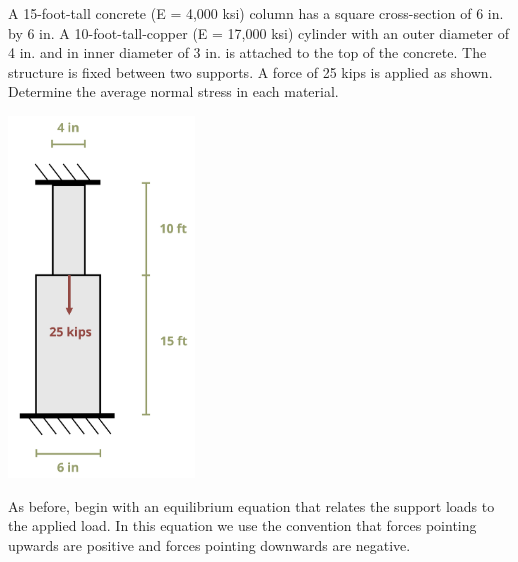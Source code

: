 \documentclass[
  letterpaper,
  DIV=11,
  numbers=noendperiod]{scrreprt}
\begin{document}
\begin{tcolorbox}[enhanced jigsaw, breakable, opacityback=0, toptitle=1mm, left=2mm, colback=white, opacitybacktitle=0.6, colframe=quarto-callout-tip-color-frame, titlerule=0mm, arc=.35mm, leftrule=.75mm, bottomtitle=1mm, colbacktitle=quarto-callout-tip-color!10!white, rightrule=.15mm, title={Example 5.6}, bottomrule=.15mm, toprule=.15mm, coltitle=black]

A 15-foot-tall concrete (E = 4,000 ksi) column has a square
cross-section of 6 in. by 6 in. A 10-foot-tall-copper (E = 17,000 ksi)
cylinder with an outer diameter of 4 in. and in inner diameter of 3 in.
is attached to the top of the concrete. The structure is fixed between
two supports. A force of 25 kips is applied as shown. Determine the
average normal stress in each material.

\begin{center}
\includegraphics[width=1.94792in,height=\textheight]{images/PNGs/Example 5.6 part 1.png}
\end{center}

\begin{tcolorbox}[enhanced jigsaw, breakable, opacityback=0, toptitle=1mm, left=2mm, colback=white, opacitybacktitle=0.6, colframe=quarto-callout-tip-color-frame, titlerule=0mm, arc=.35mm, leftrule=.75mm, bottomtitle=1mm, colbacktitle=quarto-callout-tip-color!10!white, rightrule=.15mm, title={Solution}, bottomrule=.15mm, toprule=.15mm, coltitle=black]

As before, begin with an equilibrium equation that relates the support
loads to the applied load. In this equation we use the convention that
forces pointing upwards are positive and forces pointing downwards are
negative.


\end{tcolorbox}
\end{tcolorbox}
\end{document}
